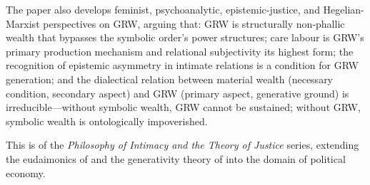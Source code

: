 The paper also develops feminist, psychoanalytic, epistemic-justice, and Hegelian-Marxist perspectives on GRW, arguing that: GRW is structurally non-phallic wealth that bypasses the symbolic order's power structures; care labour is GRW's primary production mechanism and relational subjectivity its highest form; the recognition of epistemic asymmetry in intimate relations is a condition for GRW generation; and the dialectical relation between material wealth (necessary condition, secondary aspect) and GRW (primary aspect, generative ground) is irreducible---without symbolic wealth, GRW cannot be sustained; without GRW, symbolic wealth is ontologically impoverished.

This is  of the \emph{Philosophy of Intimacy and the Theory of Justice} series, extending the eudaimonics of  \parencite{paperxiv} and the generativity theory of  \parencite{paperix} into the domain of political economy.
